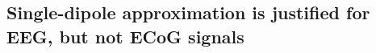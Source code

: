 \documentclass[preprint,10pt,authoryear]{elsarticle}
\newcommand{\hlg}[2][Emerald]{ {\sethlcolor{#1} \hl{#2}} }
\newcommand{\tvnnote}[1]{\color{white}{\hlg{TVN: #1 }}\color{black}}
\begin{document}
\subsection{Single-dipole approximation is justified for EEG, but not ECoG signals}\label{subsec:cb_db_comp_4s}

%
%
%
\end{document}
